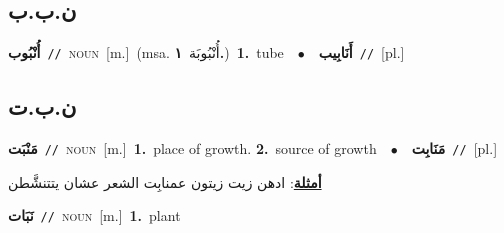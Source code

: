 \documentclass[10pt,a4paper,twoside]{article} %
\begin{document}
\begin{multicols}{2}
\vspace{-3mm}
\subsection*{\color{blue}\foreignlanguage{arabic}{ن.ب.ب}\color{blue}{ (ntws)}} 

{\setlength\topsep{0pt}\textbf{\foreignlanguage{arabic}{أُنْبُوب}}\ {\color{gray}\texttt{//}\color{black}}\ \textsc{noun}\ [m.]\ \color{gray}(msa. \foreignlanguage{arabic}{أُنْبُوبَة}~\foreignlanguage{arabic}{\textbf{١.}})\color{black}\ \textbf{1.}~tube\ \ $\bullet$\ \ \setlength\topsep{0pt}\textbf{\foreignlanguage{arabic}{أَنَابِيب}}\ {\color{gray}\texttt{//}\color{black}}\ [pl.]\ 

\vspace{-3mm}
\subsection*{\color{blue}\foreignlanguage{arabic}{ن.ب.ت}\color{blue}{}} 

{\setlength\topsep{0pt}\textbf{\foreignlanguage{arabic}{مَنْبَت}}\ {\color{gray}\texttt{//}\color{black}}\ \textsc{noun}\ [m.]\ \textbf{1.}~place of growth.  \textbf{2.}~source of growth\ \ $\bullet$\ \ \setlength\topsep{0pt}\textbf{\foreignlanguage{arabic}{مَنَابِت}}\ {\color{gray}\texttt{//}\color{black}}\ [pl.]\  \begin{flushright}\color{gray}\foreignlanguage{arabic}{\textbf{\underline{\foreignlanguage{arabic}{أمثلة}}}: ادهن زيت زيتون عمنابِت الشعر عشان يتتنشَّطن}\end{flushright}\color{black}} \vspace{2mm}

{\setlength\topsep{0pt}\textbf{\foreignlanguage{arabic}{نَبَات}}\ {\color{gray}\texttt{//}\color{black}}\ \textsc{noun}\ [m.]\ \textbf{1.}~plant\ 

}}
\end{multicols}
\end{document}
